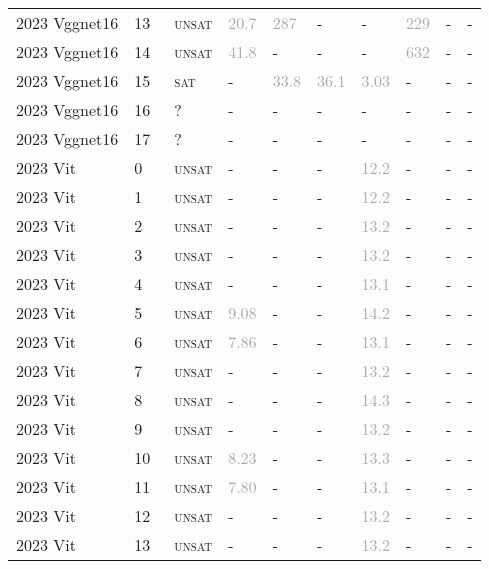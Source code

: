 \begin{center}
{\begin{longtable}{@{}llllllllll@{}}
2023 Vggnet16 & 13 & ~\textsc{unsat} & \textcolor{darkgray}{20.7} & \textcolor{darkgray}{287} & - & - & \textcolor{darkgray}{229} & - & - \\
2023 Vggnet16 & 14 & ~\textsc{unsat} & \textcolor{darkgray}{41.8} & - & - & - & \textcolor{darkgray}{632} & - & - \\
2023 Vggnet16 & 15 & ~\textsc{sat} & - & \textcolor{darkgray}{33.8} & \textcolor{darkgray}{36.1} & \textcolor{darkgray}{3.03} & - & - & - \\
2023 Vggnet16 & 16 & ~? & - & - & - & - & - & - & - \\
2023 Vggnet16 & 17 & ~? & - & - & - & - & - & - & - \\
\midrule
2023 Vit & 0 & ~\textsc{unsat} & - & - & - & \textcolor{darkgray}{12.2} & - & - & - \\
2023 Vit & 1 & ~\textsc{unsat} & - & - & - & \textcolor{darkgray}{12.2} & - & - & - \\
2023 Vit & 2 & ~\textsc{unsat} & - & - & - & \textcolor{darkgray}{13.2} & - & - & - \\
2023 Vit & 3 & ~\textsc{unsat} & - & - & - & \textcolor{darkgray}{13.2} & - & - & - \\
2023 Vit & 4 & ~\textsc{unsat} & - & - & - & \textcolor{darkgray}{13.1} & - & - & - \\
2023 Vit & 5 & ~\textsc{unsat} & \textcolor{darkgray}{9.08} & - & - & \textcolor{darkgray}{14.2} & - & - & - \\
2023 Vit & 6 & ~\textsc{unsat} & \textcolor{darkgray}{7.86} & - & - & \textcolor{darkgray}{13.1} & - & - & - \\
2023 Vit & 7 & ~\textsc{unsat} & - & - & - & \textcolor{darkgray}{13.2} & - & - & - \\
2023 Vit & 8 & ~\textsc{unsat} & - & - & - & \textcolor{darkgray}{14.3} & - & - & - \\
2023 Vit & 9 & ~\textsc{unsat} & - & - & - & \textcolor{darkgray}{13.2} & - & - & - \\
2023 Vit & 10 & ~\textsc{unsat} & \textcolor{darkgray}{8.23} & - & - & \textcolor{darkgray}{13.3} & - & - & - \\
2023 Vit & 11 & ~\textsc{unsat} & \textcolor{darkgray}{7.80} & - & - & \textcolor{darkgray}{13.1} & - & - & - \\
2023 Vit & 12 & ~\textsc{unsat} & - & - & - & \textcolor{darkgray}{13.2} & - & - & - \\
2023 Vit & 13 & ~\textsc{unsat} & - & - & - & \textcolor{darkgray}{13.2} & - & - & - \\

\end{longtable}}
\end{center}
